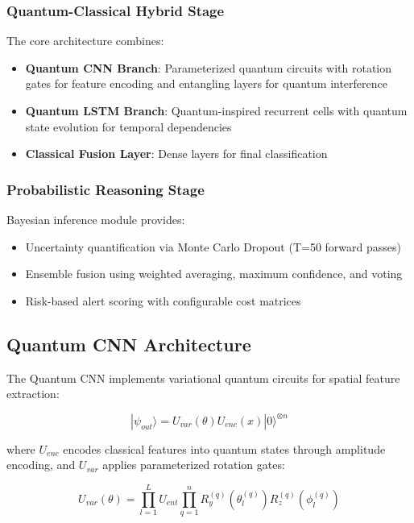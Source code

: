\documentclass[conference]{IEEEtran}
\begin{document}
\subsubsection{Quantum-Classical Hybrid Stage}
The core architecture combines:
\begin{itemize}
    \item \textbf{Quantum CNN Branch}: Parameterized quantum circuits with rotation gates for feature encoding and entangling layers for quantum interference
    \item \textbf{Quantum LSTM Branch}: Quantum-inspired recurrent cells with quantum state evolution for temporal dependencies
    \item \textbf{Classical Fusion Layer}: Dense layers for final classification
\end{itemize}

\subsubsection{Probabilistic Reasoning Stage}
Bayesian inference module provides:
\begin{itemize}
    \item Uncertainty quantification via Monte Carlo Dropout (T=50 forward passes)
    \item Ensemble fusion using weighted averaging, maximum confidence, and voting
    \item Risk-based alert scoring with configurable cost matrices
\end{itemize}

\subsection{Quantum CNN Architecture}

The Quantum CNN implements variational quantum circuits for spatial feature extraction:

\begin{equation}
|\psi_{out}\rangle = U_{var}(\theta) U_{enc}(x) |0\rangle^{\otimes n}
\end{equation}

where $U_{enc}$ encodes classical features into quantum states through amplitude encoding, and $U_{var}$ applies parameterized rotation gates:

\begin{equation}
U_{var}(\theta) = \prod_{l=1}^{L} U_{ent} \prod_{q=1}^{n} R_y^{(q)}(\theta_l^{(q)}) R_z^{(q)}(\phi_l^{(q)})
\end{equation}
\end{document}
